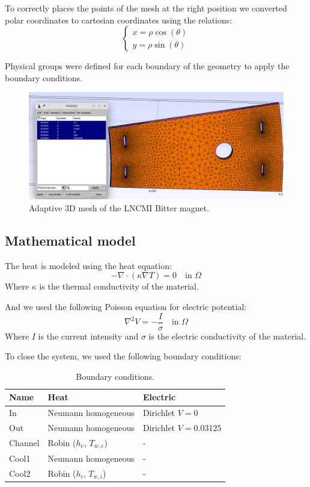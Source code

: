 \documentclass[12pt]{article}
\begin{document}
To correctly places the points of the mesh at the right position we converted polar
coordinates to cartesian coordinates using the relations:
$$
\begin{cases}
	x = \rho \cos(\theta) \\
	y = \rho \sin(\theta)
\end{cases}
$$

Physical groups were defined for each boundary of the geometry to apply the boundary conditions.

\begin{figure}[H]
	\centering
	\includegraphics[width=\textwidth]{images/bitter_mesh.png}
	\caption{Adaptive 3D mesh of the LNCMI Bitter magnet.}
\end{figure}

\subsection{Mathematical model}
The heat is modeled using the heat equation:
$$
	-\nabla \cdot (\kappa \nabla T) = 0 \quad \text{in } \Omega 
$$
Where $\kappa$ is the thermal conductivity of the material.

\noindent And we used the following Poisson equation for electric potential:
$$
	\nabla^2 V = -\frac{I}{\sigma} \quad \text{in } \Omega
$$
Where $I$ is the current intensity and $\sigma$ is the electric conductivity of the material.  

To close the system, we used the following boundary conditions:

\begin{table}[H]
	\centering
	\begin{tabular}{|l|l|l|}
	\hline
	\textbf{Name} & \textbf{Heat} & \textbf{Electric} \\ \hline
	In & Neumann homogeneous & Dirichlet $V = 0$ \\ \hline
	Out & Neumann homogeneous & Dirichlet $V = 0.03125$ \\ \hline
	Channel & Robin ($h_e$, $T_{w,e}$) & - \\ \hline
	Cool1 & Neumann homogeneous & - \\ \hline
	Cool2 & Robin ($h_i$, $T_{w,i}$) & - \\ \hline
	\end{tabular}
	\caption{Boundary conditions.}
	\label{tab:boundary_conditions}
\end{table}
\end{document}
